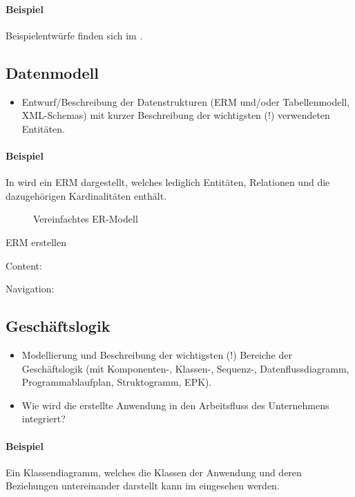 \paragraph{Beispiel}
Beispielentwürfe finden sich im .


\subsection{Datenmodell}
\label{sec:Datenmodell}

\begin{itemize}
	\item Entwurf/Beschreibung der Datenstrukturen (\zB \acs{ERM} und/oder Tabellenmodell, \acs{XML}-Schemas) mit kurzer Beschreibung der wichtigsten (!) verwendeten Entitäten.
\end{itemize}

\paragraph{Beispiel}
In  wird ein \ac{ERM} dargestellt, welches lediglich Entitäten, Relationen und die dazugehörigen Kardinalitäten enthält. 

\begin{figure}[htb]
\centering
{}
\caption{Vereinfachtes ER-Modell}
\label{fig:ER}
\end{figure} 


ERM erstellen

Content:

Navigation:


\subsection{Geschäftslogik}
\label{sec:Geschaeftslogik}

\begin{itemize}
	\item Modellierung und Beschreibung der wichtigsten (!) Bereiche der Geschäftslogik (\zB mit Kom\-po\-nen\-ten-, Klassen-, Sequenz-, Datenflussdiagramm, Programmablaufplan, Struktogramm, \ac{EPK}).
	\item Wie wird die erstellte Anwendung in den Arbeitsfluss des Unternehmens integriert?
\end{itemize}

\paragraph{Beispiel}
Ein Klassendiagramm, welches die Klassen der Anwendung und deren Beziehungen untereinander darstellt kann im  eingesehen werden.

